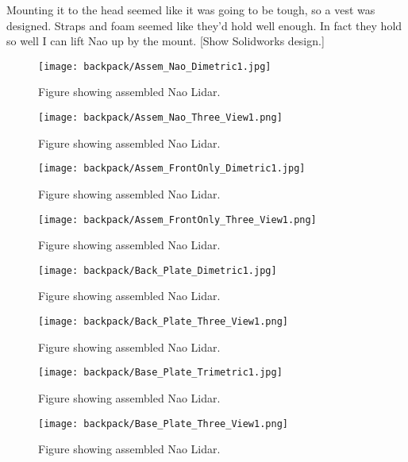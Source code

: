 Mounting it to the head seemed like it was going to be tough, so a vest was designed.
Straps and foam seemed like they'd hold well enough. In fact they hold so well I can lift Nao up by the mount.
[Show Solidworks design.]
\begin{figure}
  \centering
  \texttt{[image: backpack/Assem\_Nao\_Dimetric1.jpg]}
  \caption{Figure showing assembled Nao Lidar.}
  \label{fig:nao_lidar_mount_nao_dimetric1}
\end{figure}

\begin{figure}
  \centering
  \texttt{[image: backpack/Assem\_Nao\_Three\_View1.png]}
  \caption{Figure showing assembled Nao Lidar.}
  \label{fig:nao_lidar_mount_nao_three_view1}
\end{figure}

\begin{figure}
  \centering
  \texttt{[image: backpack/Assem\_FrontOnly\_Dimetric1.jpg]}
  \caption{Figure showing assembled Nao Lidar.}
  \label{fig:nao_lidar_mount_dimetric1}
\end{figure}

\begin{figure}
  \centering
  \texttt{[image: backpack/Assem\_FrontOnly\_Three\_View1.png]}
  \caption{Figure showing assembled Nao Lidar.}
  \label{fig:nao_lidar_mount_three_view1}
\end{figure}

\begin{figure}
  \centering
  \texttt{[image: backpack/Back\_Plate\_Dimetric1.jpg]}
  \caption{Figure showing assembled Nao Lidar.}
  \label{fig:nao_lidar_mount_backplate_dimetric1}
\end{figure}

\begin{figure}
  \centering
  \texttt{[image: backpack/Back\_Plate\_Three\_View1.png]}
  \caption{Figure showing assembled Nao Lidar.}
  \label{fig:nao_lidar_mount_backplate_three_view1}
\end{figure}

\begin{figure}
  \centering
  \texttt{[image: backpack/Base\_Plate\_Trimetric1.jpg]}
  \caption{Figure showing assembled Nao Lidar.}
  \label{fig:nao_lidar_mount_baseplate_trimetric1}
\end{figure}

\begin{figure}
  \centering
  \texttt{[image: backpack/Base\_Plate\_Three\_View1.png]}
  \caption{Figure showing assembled Nao Lidar.}
  \label{fig:nao_lidar_mount_baseplate_three_view1}
\end{figure}

